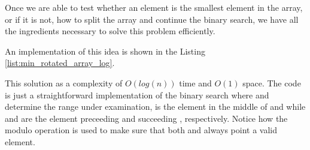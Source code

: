 Once we are able to test whether an element is the smallest element in the array, or if it is not, how to split the array and continue the binary search, we have all the ingredients necessary to solve this problem efficiently.

An implementation of this idea is shown in the Listing \ref{list:min_rotated_array_log}. 




This solution as a complexity of $O(log(n))$ time and $O(1)$ space.
The code is just a straightforward implementation of the binary search where  and  determine the range under examination,  is the element in the middle of  and  while  and  are the element preceeding and succeeding , respectively. Notice how the modulo operation is used to make sure that both  and  always point a valid element. 
